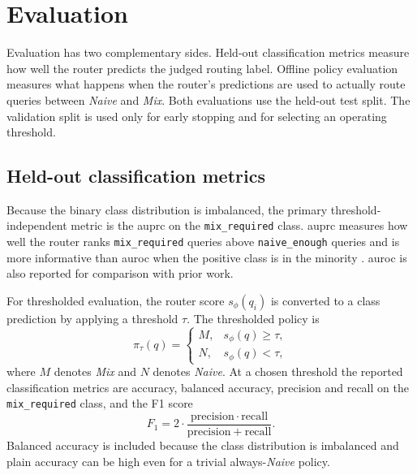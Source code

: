 \documentclass[english, bibtex]{kththesis}               %
\numberwithin{listing}{chapter}
\begin{document}
\section{Evaluation}
\label{sec:methodEvaluation}

Evaluation has two complementary sides. Held-out classification metrics measure how well the router predicts the judged routing label. Offline policy evaluation measures what happens when the router's predictions are used to actually route queries between \emph{Naive} and \emph{Mix}. Both evaluations use the held-out test split. The validation split is used only for early stopping and for selecting an operating threshold.

\subsection{Held-out classification metrics}
\label{sec:methodHeldOut}

Because the binary class distribution is imbalanced, the primary threshold-independent metric is the \gls{auprc} on the \texttt{mix\_required} class. \Gls{auprc} measures how well the router ranks \texttt{mix\_required} queries above \texttt{naive\_enough} queries and is more informative than \gls{auroc} when the positive class is in the minority \cite{saito2015precision}. \Gls{auroc} is also reported for comparison with prior work.

For thresholded evaluation, the router score \(s_\phi(q_i)\) is converted to a class prediction by applying a threshold \(\tau\). The thresholded policy is
\begin{equation}
\label{eq:routingPolicy}
\pi_\tau(q) =
\begin{cases}
M, & s_\phi(q) \geq \tau,\\
N, & s_\phi(q) < \tau,
\end{cases}
\end{equation}
where \(M\) denotes \emph{Mix} and \(N\) denotes \emph{Naive}. At a chosen threshold the reported classification metrics are accuracy, balanced accuracy, precision and recall on the \texttt{mix\_required} class, and the F1 score
\begin{equation}
\label{eq:f1}
F_1 = 2 \cdot
\frac{\mathrm{precision} \cdot \mathrm{recall}}
     {\mathrm{precision} + \mathrm{recall}}.
\end{equation}
Balanced accuracy is included because the class distribution is imbalanced and plain accuracy can be high even for a trivial always-\emph{Naive} policy.
\end{document}
